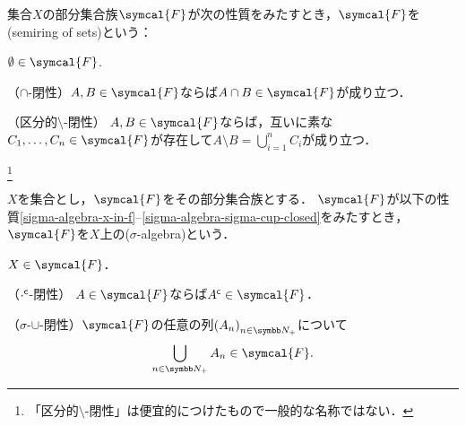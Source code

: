\documentclass[../main.tex]{subfiles}
\begin{document}
\begin{thmbox}
\begin{definition}
集合\(X\)の部分集合族\(\symcal{F}\)が次の性質をみたすとき，\(\symcal{F}\)を(semiring of sets)という：
\begin{conditions}
    \item\label{semiring-emptyset} \(\emptyset \in \symcal{F}\).
    \item （\(\mathord{\cap}\)-閉性）\(A, B \in \symcal{F}\)ならば\(A \cap B \in \symcal{F}\)が成り立つ．
    \item\label{semiring-setminus}（区分的\(\mathord{\setminus}\)-閉性\footnotemark）
        \(A, B \in \symcal{F}\)ならば，互いに素な\(C_1, \ldots, C_n \in \symcal{F}\)が存在して\(A \setminus B = \bigcup_{i = 1}^n C_i\)が成り立つ．
\end{conditions}
\end{definition}
\end{thmbox}

\footnote{「区分的\(\mathord{\setminus}\)-閉性」は便宜的につけたもので一般的な名称ではない．}

\begin{thmbox}
\begin{definition}
\(X\)を集合とし，\(\symcal{F}\)をその部分集合族とする．
\(\symcal{F}\)が以下の性質\ref{sigma-algebra-x-in-f}--\ref{sigma-algebra-sigma-cup-closed}をみたすとき，
\(\symcal{F}\)を\(X\)上の(\(\sigma\)-algebra)という{\footnotemark}．
\begin{conditions}
    \item\label{sigma-algebra-x-in-f}
        \(X \in \symcal{F}\)．
    \item\label{sigma-algebra-comp-closed} （\({\mathord{\cdot}}^{\mathsf{c}}\)-閉性） \(A \in \symcal{F}\)ならば\(\setcomp{A} \in \symcal{F}\)．
    \item\label{sigma-algebra-sigma-cup-closed} （\(\sigma\)-\(\mathord{\cup}\)-閉性）\(\symcal{F}\)の任意の列\(\Sequence{A}\)について
        \begin{align*}
            \bigcup_{n \in \PositiveInteger} A_n \in \symcal{F}.
        \end{align*}
\end{conditions}
\end{definition}
\end{thmbox}

\end{document}

